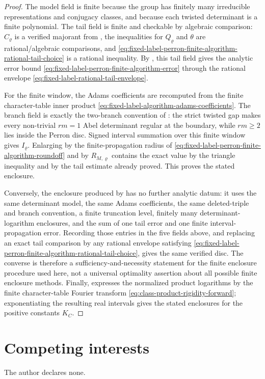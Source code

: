 \documentclass[11pt,a4paper]{amsart}
\theoremstyle{plain}
\theoremstyle{definition}
\theoremstyle{remark}
\begin{document}
\begin{proof}
  The model field is finite because the group has finitely many irreducible
  representations and conjugacy classes, and because each twisted determinant
  is a finite polynomial.  The tail field is finite and checkable by algebraic
  comparison: \(C_\varrho\) is a verified majorant from
  , the inequalities for
  \(Q_\varrho\) and \(\theta\) are rational/algebraic comparisons, and
  \eqref{eq:fixed-label-perron-finite-algorithm-rational-tail-choice} is a
  rational inequality.  By ,
  this tail field gives the analytic error bound
  \eqref{eq:fixed-label-perron-finite-algorithm-error} through the rational
  envelope \eqref{eq:fixed-label-rational-tail-envelope}.

  For the finite window, the Adams coefficients are recomputed from the finite
  character-table inner product
  \eqref{eq:fixed-label-algorithm-adams-coefficients}.  The branch field is
  exactly the two-branch convention of
  : the strict twisted gap makes
  every non-trivial \(rm=1\) Abel determinant regular at the boundary, while
  \(rm\ge2\) lies inside the Perron disc.  Signed interval summation over this
  finite window gives \(I_\varrho\).  Enlarging by the finite-propagation radius
  of \eqref{eq:fixed-label-perron-finite-algorithm-roundoff} and by
  \(R_{M,\varrho}\) contains the exact value by the triangle inequality and by
  the tail estimate already proved.  This proves the stated enclosure.

  Conversely, the enclosure produced by 
  has no further analytic datum: it uses the same determinant model, the same
  Adams coefficients, the same deleted-triple and branch convention, a finite
  truncation level, finitely many determinant-logarithm enclosures, and the sum
  of one tail error and one finite interval-propagation error.  Recording those
  entries in the five fields above, and replacing an exact tail comparison by
  any rational envelope satisfying
  \eqref{eq:fixed-label-perron-finite-algorithm-rational-tail-choice}, gives
  the same verified disc.  The converse is therefore a sufficiency-and-necessity
  statement for the finite enclosure procedure used here, not a universal
  optimality assertion about all possible finite enclosure methods.  Finally,
   expresses the normalized product
  logarithms by the finite character-table Fourier transform
  \eqref{eq:class-product-rigidity-forward}; exponentiating the resulting real
  intervals gives the stated enclosures for the positive constants \(K_C\).
\end{proof}







\section*{Competing interests}
The author declares none.



\end{document}
